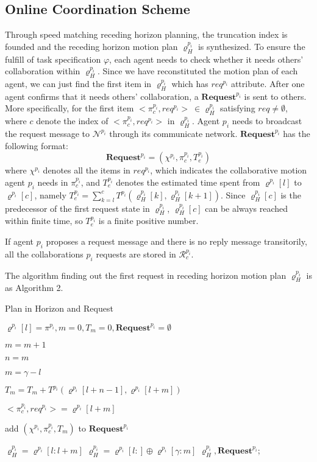 \documentclass[journal]{IEEEtran}
\begin{document}
\subsection{Online Coordination Scheme}
Through speed matching receding horizon planning, the truncation index is founded and the receding horizon motion plan $\varrho^{p_i}_H$ is synthesized. To ensure the fulfill of task specification $\varphi$, each agent needs to check whether it needs others' collaboration within $\varrho^{p_i}_H$. Since we have reconstituted the motion plan of each agent, we can just find the first item in $\varrho^{p_i}_H$ which has $req^{p_i}$ attribute.  After one agent confirms that it needs others' collaboration, a $\textbf{Request}^{p_i}$ is sent to others. More specifically, for the first item $<\pi_c^{p_i},req^{p_i}>\ \in \varrho^{p_i}_H$ satisfying $req \neq \emptyset$, where $c$ denote the index of $<\pi_c^{p_i},req^{p_i}>$ in $\varrho^{p_i}_H$. Agent $p_i$ needs to broadcast the request message to $\mathcal{N}^{p_i}$ through its communicate network. $\textbf{Request}^{p_i}$ has the following format:
$$\textbf{Request}^{p_i} = (\chi^{p_i},\pi_c^{p_i},T^{p_i}_e)$$
where $\chi^{p_i}$ denotes all the items in $req^{p_i}$, which indicates the collaborative motion agent $p_i$ needs in $\pi_c^{p_i}$, and $T^{p_i}_e$ denotes the estimated time spent from $\varrho^{p_i}[l]$ to $\varrho^{p_i}[c]$, namely $T^{p_i}_e=\sum_{k=l}^{c}T^{p_i}(\varrho^{p_i}_H[k],\varrho^{p_i}_H[k+1])$. Since $\varrho^{p_i}_H[c]$ is the predecessor of the first request state in $\varrho^{p_i}_H$, $\varrho^{p_i}_H[c]$ can be always reached within finite time, so $T^{p_i}_e$ is a finite positive number.\par
If agent $p_i$ proposes a request message and there is no reply message transitorily, all the collaborations $p_i$ requests are stored in $\mathcal{R}^{p_i}_c$.\par
The algorithm finding out the first request in receding horizon motion plan $\varrho^{p_i}_H$ is as Algorithm 2.\par
\begin{algorithm}
  \caption{Plan in Horizon and Request}
  $\varrho^{p_i}[l]=\pi^{p_i},m=0,T_m=0,\textbf{Request}^{p_i}=\emptyset$

  {
    $m=m+1$

    $n=m$

    {
        $m=\gamma-l$
    }

    $T_m=T_m+T^{p_i}(\varrho^{p_i}[l+n-1],\varrho^{p_i}[l+m])$

    $<\pi^{p_i}_c,req^{p_i}>=\varrho^{p_i}[l+m]$

    {
        {
            add $(\chi^{p_i},\pi^{p_i}_c,T_m)$ to $\textbf{Request}^{p_i}$
        }
    }
  }
  {
    $\varrho^{p_i}_H=\varrho^{p_i}[l:l+m]$
  }
  \Else
  {
    $\varrho^{p_i}_H=\varrho^{p_i}[l:]\oplus \varrho^{p_i}[\gamma:m]$
  }
  \Return $\varrho^{p_i}_H,\textbf{Request}^{p_i}$;
\end{algorithm}
\end{document}
